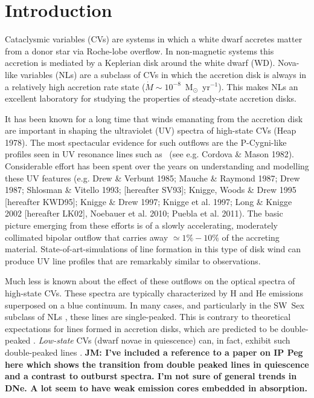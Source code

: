 \documentclass[preprint, a4paper, 11pt]{aastex}
\begin{document}
\maketitle


%
%

\section{Introduction} 
\label{sec:intro}

Cataclysmic variables (CVs) are systems in which a white dwarf
accretes matter from a donor star via Roche-lobe overflow. In
non-magnetic systems this accretion is mediated by a Keplerian disk
around the white dwarf (WD). Nova-like variables (NLs) are a subclass
of CVs in which the accretion disk is always in a relatively
high accretion rate state ($\dot{M} \sim
10^{-8}$~M$_{\odot}$~yr$^{-1}$).  This makes NLs an excellent
laboratory for studying the properties of steady-state accretion
disks.

It has been known for a long time that winds emanating from the
accretion disk are important in shaping the ultraviolet (UV) spectra
of high-state CVs (Heap 1978). The most spectacular evidence for such
outflows are the P-Cygni-like profiles seen in UV resonance lines such as
\civfull\ (see e.g. Cordova \& Mason
1982\nocite{cordova1982}). Considerable effort has been spent over the
years on understanding and modelling these UV features (e.g. Drew \&
Verbunt 1985\nocite{drewverbunt1985}; Mauche \& Raymond
1987\nocite{maucheraymond1987}; Drew 1987; Shlosman \& Vitello 1993; [hereafter
SV93]\nocite{SV93}; Knigge, Woods \& Drew 1995 [hereafter
KWD95]\nocite{KWD95}; Knigge \& Drew 1997\nocite{kd1997}; 
Knigge et al. 1997\nocite{knigge1997}; Long \&
Knigge 2002 [hereafter LK02]\nocite{LK02}, Noebauer et al. 2010;
Puebla et al. 2011\nocite{puebla2011}). The basic picture emerging from these efforts is
of a slowly accelerating, moderately collimated bipolar
outflow that carries away $\simeq 1\% - 10\%$ of the accreting
material. State-of-art-simulations of line formation in this type
of disk wind can produce UV line profiles that are remarkably similar
to observations.

Much less is known about the effect of these outflows on the optical
spectra of high-state CVs. These spectra are typically characterized
by H and He emissions superposed on a blue continuum. In many
cases, and particularly in the SW~Sex subclass of NLs
\citep{HSK86,DR95}, these lines are single-peaked. This is contrary to
theoretical expectations for lines formed in accretion disks, which
are predicted to be double-peaked \citep{smak1981, hornemarsh1986}. 
{\em Low-state} CVs (dwarf novae in quiescence) can, in fact,
exhibit such double-peaked lines \citep{marshhorne1990}. 
{\bf JM: I've included a reference to a paper on IP Peg here
which shows the transition from double peaked lines in 
quiescence and a contrast to outburst spectra. I'm not sure
of general trends in DNe. A lot seem to have weak emission cores
embedded in absorption.}
\end{document}
